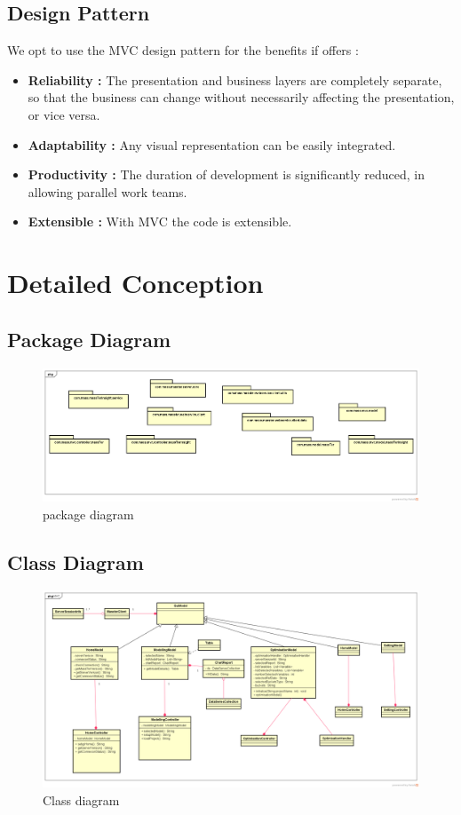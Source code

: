     \clearpage
	\newpage
	\subsection{Design Pattern}
		We opt to use the MVC design pattern for the benefits if offers :
	\begin{itemize}
		\item \textbf{Reliability : }The presentation and business layers are completely separate, so that the business can change without necessarily affecting the presentation, or vice versa.
		\item \textbf{Adaptability : }Any visual representation can be easily integrated.
		\item \textbf{Productivity : }The duration of development is significantly reduced, in allowing parallel work teams.
		\item \textbf{Extensible : } With MVC the code is extensible.
	\end{itemize}

	\clearpage
    \newpage

	\section{Detailed Conception}
    \clearpage
	\newpage
	\subsection{Package Diagram}
		\begin{figure}[h]
		\centering
		\includegraphics[width=1\textwidth]{packageDiagram.png}
		\caption{package diagram}
	\end{figure}  
	
	\clearpage
	\newpage
	\subsection{Class Diagram}
	\begin{figure}[h]
		\centering
		\includegraphics[width=1\textwidth]{classDiagram.png}
		\caption{Class diagram}
	\end{figure} 
	\clearpage
	\newpage
